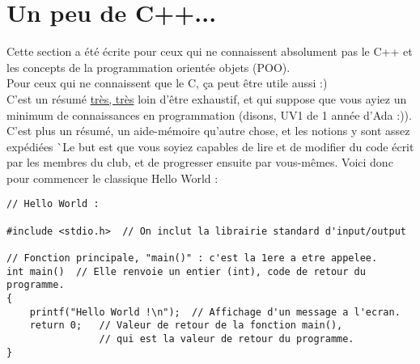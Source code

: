 
\section{Un peu de C++...}

Cette section a été écrite pour ceux qui ne connaissent absolument pas le C++ et les concepts de la programmation orientée objets (POO).\\
Pour ceux qui ne connaissent que le C, ça peut être utile aussi :)\\
C'est un résumé \underline{très, très} loin d'être exhaustif, et qui suppose que vous ayiez un minimum de connaissances en programmation (disons, UV1 de 1 année d'Ada :)). C'est plus un résumé, un aide-mémoire qu'autre chose, et les notions y sont assez expédiées ^^ Le but est que vous soyiez capables de lire et de modifier du code écrit par les membres du club, et de progresser ensuite par vous-mêmes. Voici donc pour commencer le classique Hello World :

\begin{lstlisting}
// Hello World :

#include <stdio.h>	// On inclut la librairie standard d'input/output

// Fonction principale, "main()" : c'est la 1ere a etre appelee.
int main()	// Elle renvoie un entier (int), code de retour du programme.
{
	printf("Hello World !\n");	// Affichage d'un message a l'ecran.
	return 0;	// Valeur de retour de la fonction main(),
				// qui est la valeur de retour du programme.
}
\end{lstlisting}

